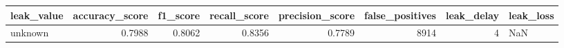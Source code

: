 \begin{tabular}{lrrrrrrl}
\toprule
leak\_value & accuracy\_score & f1\_score & recall\_score & precision\_score & false\_positives & leak\_delay & leak\_loss \\
\midrule
unknown & 0.7988 & 0.8062 & 0.8356 & 0.7789 & 8914 & 4 & NaN \\
\bottomrule
\end{tabular}
